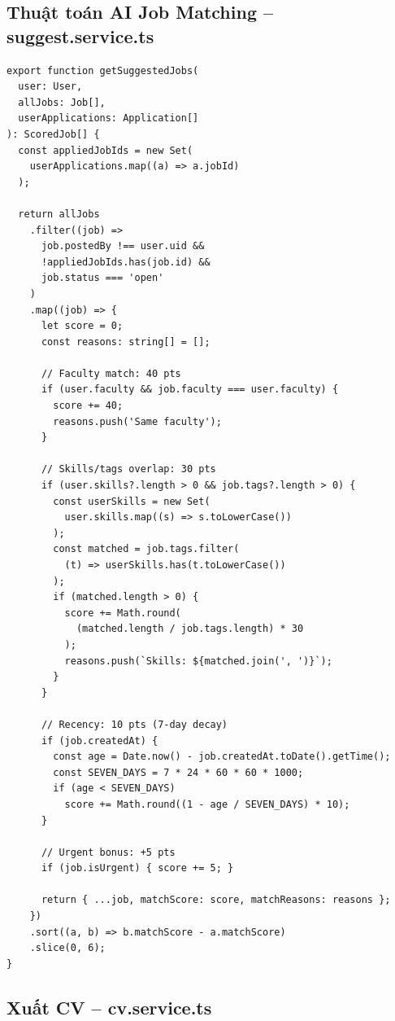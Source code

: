 \subsection{Thuật toán AI Job Matching -- suggest.service.ts}

\begin{lstlisting}[caption={suggest.service.ts -- Scoring algorithm}]
export function getSuggestedJobs(
  user: User,
  allJobs: Job[],
  userApplications: Application[]
): ScoredJob[] {
  const appliedJobIds = new Set(
    userApplications.map((a) => a.jobId)
  );

  return allJobs
    .filter((job) =>
      job.postedBy !== user.uid &&
      !appliedJobIds.has(job.id) &&
      job.status === 'open'
    )
    .map((job) => {
      let score = 0;
      const reasons: string[] = [];

      // Faculty match: 40 pts
      if (user.faculty && job.faculty === user.faculty) {
        score += 40;
        reasons.push('Same faculty');
      }

      // Skills/tags overlap: 30 pts
      if (user.skills?.length > 0 && job.tags?.length > 0) {
        const userSkills = new Set(
          user.skills.map((s) => s.toLowerCase())
        );
        const matched = job.tags.filter(
          (t) => userSkills.has(t.toLowerCase())
        );
        if (matched.length > 0) {
          score += Math.round(
            (matched.length / job.tags.length) * 30
          );
          reasons.push(`Skills: ${matched.join(', ')}`);
        }
      }

      // Recency: 10 pts (7-day decay)
      if (job.createdAt) {
        const age = Date.now() - job.createdAt.toDate().getTime();
        const SEVEN_DAYS = 7 * 24 * 60 * 60 * 1000;
        if (age < SEVEN_DAYS)
          score += Math.round((1 - age / SEVEN_DAYS) * 10);
      }

      // Urgent bonus: +5 pts
      if (job.isUrgent) { score += 5; }

      return { ...job, matchScore: score, matchReasons: reasons };
    })
    .sort((a, b) => b.matchScore - a.matchScore)
    .slice(0, 6);
}
\end{lstlisting}

\subsection{Xuất CV -- cv.service.ts}


